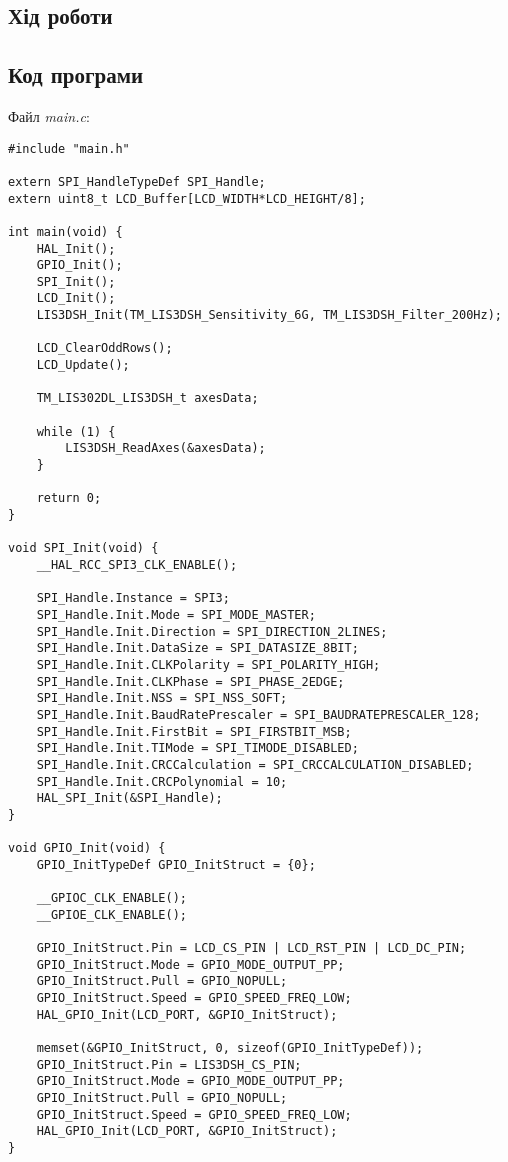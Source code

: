 \documentclass[oneside,14pt]{extarticle}
\begin{document}
\begin{normalsize}
	\section*{Хід роботи}
	
	\subsection*{Код програми}
	Файл \textit{main.c}:
	{\small
		\begin{lstlisting}
#include "main.h"

extern SPI_HandleTypeDef SPI_Handle;
extern uint8_t LCD_Buffer[LCD_WIDTH*LCD_HEIGHT/8];

int main(void) {
	HAL_Init();
	GPIO_Init();
	SPI_Init();
	LCD_Init();
	LIS3DSH_Init(TM_LIS3DSH_Sensitivity_6G, TM_LIS3DSH_Filter_200Hz);
	
	LCD_ClearOddRows();
	LCD_Update();
	
	TM_LIS302DL_LIS3DSH_t axesData;
	
	while (1) {
		LIS3DSH_ReadAxes(&axesData);
	}
	
	return 0;
}

void SPI_Init(void) {
	__HAL_RCC_SPI3_CLK_ENABLE();

	SPI_Handle.Instance = SPI3;
	SPI_Handle.Init.Mode = SPI_MODE_MASTER;
	SPI_Handle.Init.Direction = SPI_DIRECTION_2LINES;
	SPI_Handle.Init.DataSize = SPI_DATASIZE_8BIT;
	SPI_Handle.Init.CLKPolarity = SPI_POLARITY_HIGH;
	SPI_Handle.Init.CLKPhase = SPI_PHASE_2EDGE;
	SPI_Handle.Init.NSS = SPI_NSS_SOFT;
	SPI_Handle.Init.BaudRatePrescaler = SPI_BAUDRATEPRESCALER_128;
	SPI_Handle.Init.FirstBit = SPI_FIRSTBIT_MSB;
	SPI_Handle.Init.TIMode = SPI_TIMODE_DISABLED;
	SPI_Handle.Init.CRCCalculation = SPI_CRCCALCULATION_DISABLED;
	SPI_Handle.Init.CRCPolynomial = 10;
	HAL_SPI_Init(&SPI_Handle);
}

void GPIO_Init(void) {
	GPIO_InitTypeDef GPIO_InitStruct = {0};

	__GPIOC_CLK_ENABLE();
	__GPIOE_CLK_ENABLE();

	GPIO_InitStruct.Pin = LCD_CS_PIN | LCD_RST_PIN | LCD_DC_PIN;
	GPIO_InitStruct.Mode = GPIO_MODE_OUTPUT_PP;
	GPIO_InitStruct.Pull = GPIO_NOPULL;
	GPIO_InitStruct.Speed = GPIO_SPEED_FREQ_LOW;
	HAL_GPIO_Init(LCD_PORT, &GPIO_InitStruct);
	
	memset(&GPIO_InitStruct, 0, sizeof(GPIO_InitTypeDef));
	GPIO_InitStruct.Pin = LIS3DSH_CS_PIN;
	GPIO_InitStruct.Mode = GPIO_MODE_OUTPUT_PP;
	GPIO_InitStruct.Pull = GPIO_NOPULL;
	GPIO_InitStruct.Speed = GPIO_SPEED_FREQ_LOW;
	HAL_GPIO_Init(LCD_PORT, &GPIO_InitStruct);
}


\end{lstlisting}}
\end{normalsize}
\end{document}
